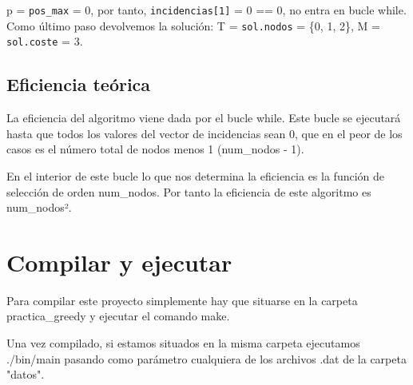 \documentclass[11pt]{article}
\begin{document}
 p = \verb|pos_max| = 0, por tanto, \verb|incidencias[1]| = 0 == 0, no entra en bucle while. Como último paso devolvemos la solución:  T  = \verb|sol.nodos| = \{0, 1, 2\}, M = \verb|sol.coste| = 3.
 
\subsection*{Eficiencia teórica}
La eficiencia del algoritmo viene dada por el bucle while. Este bucle se ejecutará hasta que todos los valores del vector de incidencias sean 0, que en el peor de los casos es el número total de nodos menos 1 (num\_nodos - 1).

En el interior de este bucle lo que nos determina la eficiencia es la función de selección de orden num\_nodos. Por tanto la eficiencia de este algoritmo es num\_nodos².


\section*{Compilar y ejecutar}
Para compilar este proyecto simplemente hay que situarse en la carpeta practica\_greedy y ejecutar el comando make.

Una vez compilado, si estamos situados en la misma carpeta ejecutamos ./bin/main pasando como parámetro cualquiera de los archivos .dat de la carpeta "datos".
\end{document}
